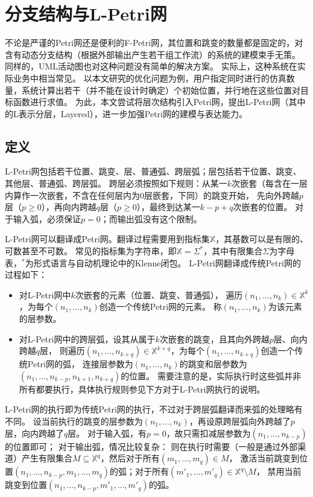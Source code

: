 \documentclass[index]{subfiles}
\begin{document}
\section{分支结构与L-Petri网}
不论是严谨的Petri网还是便利的F-Petri网，其位置和跳变的数量都是固定的，对含有动态分支结构（根据外部输出产生若干组工作流）的系统的建模束手无策。
同样的，UML活动图也对这种问题没有简单的解决方案。
实际上，这种系统在实际业务中相当常见。
以本文研究的优化问题为例，用户指定同时进行的仿真数量，系统计算出若干（并不能在设计时确定）个初始位置，并行地在这些位置对目标函数进行求值。
为此，本文尝试将层次结构引入Petri网，提出L-Petri网（其中的L表示分层，Layered），进一步加强Petri网的建模与表达能力。

\subsection{定义}
L-Petri网包括若干位置、跳变、层、普通弧、跨层弧；层包括若干位置、跳变、其他层、普通弧、跨层弧。
跨层必须按照如下规则：从某一$k$次嵌套（每含在一层内算作一次嵌套，不含在任何层内为0层嵌套，下同）的跳变开始，
先向外跨越$p$层（$p\geq 0$），再向内跨越$q$层（$p\geq 0$），最终到达某一$k-p+q$次嵌套的位置。
对于输入弧，必须保证$p=0$；而输出弧没有这个限制。

L-Petri网可以翻译成Petri网。翻译过程需要用到指标集$\mathbb{X}$，其基数可以是有限的、可数甚至不可数。
常见的指标集为字符串，即$\mathbb{X}=\Sigma^*$，其中有限集合$\Sigma$为字母表，${}^*$为形式语言与自动机理论中的Klenne闭包。
L-Petri网翻译成传统Petri网的过程如下：
\begin{itemize}
  \item 对L-Petri网中$k$次嵌套的元素（位置、跳变、普通弧），
    遍历$\left(n_1,\ldots,n_k\right)\in\mathbb{X}^k$，为每个$\left(n_1,\ldots,n_k\right)$创造一个传统Petri网的元素。
    称$\left(n_1,\ldots,n_k\right)$为该元素的层参数。
  \item 对L-Petri网中的跨层弧，设其从属于$k$次嵌套的跳变，且其向外跨越$p$层、向内跨越$q$层，
    则遍历$\left(n_1,\ldots,n_{k+q}\right)\in\mathbb{X}^{k+q}$，为每个$\left(n_1,\ldots,n_{k+q}\right)$创造一个传统Petri网的弧，
    连接层参数为$\left(n_1,\ldots,n_k\right)$的跳变和层参数为$\left(n_1,\ldots,n_{k-p},n_{k+1},n_{k+q}\right)$的位置。
    需要注意的是，实际执行时这些弧并非所有都要执行，具体执行规则参见下方对于L-Petri网执行的说明。
\end{itemize}

L-Petri网的执行即为传统Petri网的执行，不过对于跨层弧翻译而来弧的处理略有不同。
设当前执行的跳变的层参数为$\left(n_1,\ldots,n_k\right)$，再设原跨层弧向外跨越了$p$层，向内跨越了$q$层。
对于输入弧，有$p=0$，故只需扣减层参数为$\left(n_1,\ldots,n_{k-p}\right)$的位置即可；
对于输出弧，情况比较复杂：
则在执行时需要（一般是通过外部渠道）产生有限集合$M\subseteq\mathbb{X}^{q}$，然后对于所有$\left(m_1,\ldots,m_q\right)\in{}M$，
激活当前跳变到位置$\left(n_1,\ldots,n_{k-p},m_1,\ldots,m_q\right)$的弧；对于所有$\left(m'_1,\ldots,m'_q\right)\in{}\mathbb{X}^{q}\setminus{}M$，
禁用当前跳变到位置$\left(n_1,\ldots,n_{k-p},m'_1,\ldots,m'_q\right)$的弧。
\end{document}
